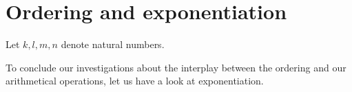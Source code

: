 \documentclass[../../arithmetic.ftl.tex]{subfiles}
\begin{document}
  \begin{comment}
    \begin{forthel}

    \end{forthel}
  \end{comment}


  \section{Ordering and exponentiation}

  \begin{forthel}
  \end{forthel}

  \begin{forthel}
  \end{forthel}

  \begin{forthel}
    Let $k, l, m, n$ denote natural numbers.
  \end{forthel}

  To conclude our investigations about the interplay between the ordering and
  our arithmetical operations, let us have a look at exponentiation.
\end{document}
